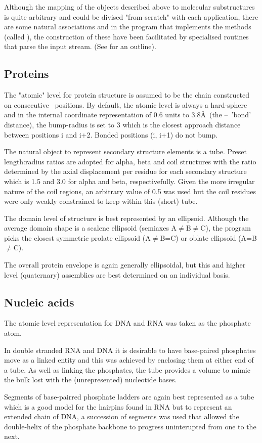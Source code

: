 Although the mapping of the objects described above to molecular substructures is quite
arbitrary and could be divised "from scratch" with each application, there are some
natural associations and in the program that implements the methods (called \NAME),
the construction of these have been facilitated by specialised routines that parse
the input stream. (See \cite{} for an outline).

\subsection{Proteins}

The "atomic" level for protein structure is assumed to be the chain constructed on
consecutive \CA\ positions.   By default, the atomic level is always a hard-sphere
and in the internal coordinate representation of 0.6 units to 3.8\AA\ (the \CA--\CA\
'bond' distance), the bump-radius is set to 3 which is the closest approach distance 
between positions i and i+2.   Bonded positions (i, i+1) do not bump.  

The natural object to represent secondary structure elements is a tube.   Preset
length:radius ratios are adopted for alpha, beta and coil structures with the ratio
determined by the axial displacement per residue for each secondary structure which
is 1.5 and 3.0 for alpha and beta, respectivefully.   Given the more irregular nature
of the coil regions, an arbitrary value of 0.5 was used but the coil residues were
only weakly constrained to keep within this (short) tube.

The domain level of structure is best represented by an ellipsoid.   Although the
average domain shape is a scalene ellipsoid (semiaxes A$\ne$B$\ne$C), the program picks
the closest symmetric prolate ellipsoid (A$\ne$B=C) or oblate ellipsoid (A=B$\ne$C).

The overall protein envelope is again generally ellipsoidal, but this and higher
level (quaternary) assemblies are best determined on an individual basis.

\subsection{Nucleic acids}

The atomic level representation for DNA and RNA was taken as the phosphate atom.

In double stranded RNA and DNA it is desirable to have base-paired phosphates
move as a linked entity and this was achieved by enclosing them at either end of
a tube.  As well as linking the phosphates, the tube provides a volume to mimic
the bulk lost with the (unrepresented) nucleotide bases.

Segments of base-pairred phosphate ladders are again best represented as a tube
which is a good model for the hairpins found in RNA but to represent an extended
chain of DNA, a succession of segments was used that allowed the double-helix
of the phosphate backbone to progress uninterupted from one to the next.
